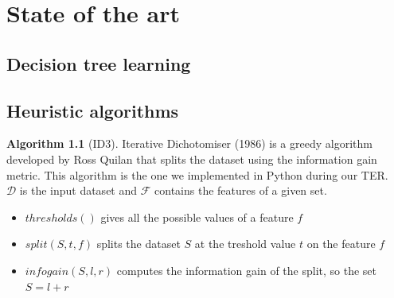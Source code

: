 \documentclass[12pt]{report}
\theoremstyle{definition}
\theoremstyle{definition}
\newtheorem*{algo}{Algorithm}
\theoremstyle{definition}
\begin{document}
\chapter{State of the art}
\section{Decision tree learning} %
\section{Heuristic algorithms} %
\begin{algo}[ID3]
    Iterative Dichotomiser (1986) is a greedy algorithm developed by Ross Quilan that splits the dataset
    using the information gain metric. This algorithm is the one we implemented in Python during our TER.\\
    $\mathcal{D}$ is the input dataset and $\mathcal{F}$ contains the features of a given set.

\begin{algorithm}
    \caption{ID3}\label{alg:two}
    \DontPrintSemicolon

    \;
    \;

\end{algorithm}

\begin{itemize}
    \item $thresholds()$ gives all the possible values of a feature $f$
    \item $split(S, t, f)$ splits the dataset $S$ at the treshold value $t$ on the feature $f$
    \item $infogain(S, l, r)$ computes the information gain of the split, so the set $S=l+r$ 
\end{itemize}
\end{algo}
\end{document}
